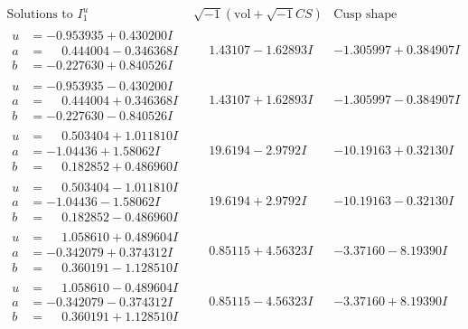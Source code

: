 \documentclass[1p]{elsarticle_modified}
\theoremstyle{definition}
\newcommand{\I}{\sqrt{-1}}
\begin{document}
$$\begin{array}{c|c|c}  
\text{Solutions to }I^u_{1}& \I (\text{vol} + \sqrt{-1}CS) & \text{Cusp shape}\\
 \hline 
\begin{aligned}
u &= -0.953935 + 0.430200 I \\
a &= \phantom{-}0.444004 - 0.346368 I \\
b &= -0.227630 + 0.840526 I\end{aligned}
 & \phantom{-}1.43107 - 1.62893 I & -1.305997 + 0.384907 I \\ \hline\begin{aligned}
u &= -0.953935 - 0.430200 I \\
a &= \phantom{-}0.444004 + 0.346368 I \\
b &= -0.227630 - 0.840526 I\end{aligned}
 & \phantom{-}1.43107 + 1.62893 I & -1.305997 - 0.384907 I \\ \hline\begin{aligned}
u &= \phantom{-}0.503404 + 1.011810 I \\
a &= -1.04436 + 1.58062 I \\
b &= \phantom{-}0.182852 + 0.486960 I\end{aligned}
 & \phantom{-}19.6194 - 2.9792 I & -10.19163 + 0.32130 I \\ \hline\begin{aligned}
u &= \phantom{-}0.503404 - 1.011810 I \\
a &= -1.04436 - 1.58062 I \\
b &= \phantom{-}0.182852 - 0.486960 I\end{aligned}
 & \phantom{-}19.6194 + 2.9792 I & -10.19163 - 0.32130 I \\ \hline\begin{aligned}
u &= \phantom{-}1.058610 + 0.489604 I \\
a &= -0.342079 + 0.374312 I \\
b &= \phantom{-}0.360191 - 1.128510 I\end{aligned}
 & \phantom{-}0.85115 + 4.56323 I & -3.37160 - 8.19390 I \\ \hline\begin{aligned}
u &= \phantom{-}1.058610 - 0.489604 I \\
a &= -0.342079 - 0.374312 I \\
b &= \phantom{-}0.360191 + 1.128510 I\end{aligned}
 & \phantom{-}0.85115 - 4.56323 I & -3.37160 + 8.19390 I \\ \hline\begin{aligned}

\end{aligned}
\end{array}$$
\end{document}
